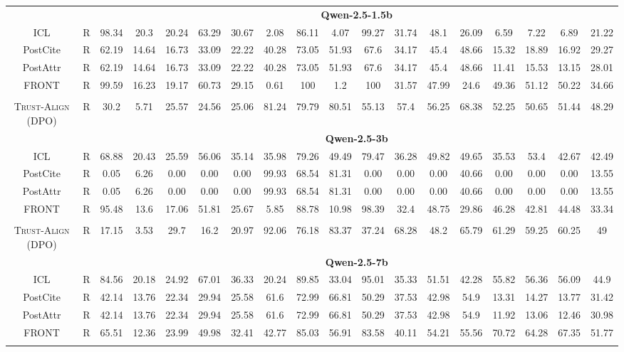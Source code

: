 \documentclass{article} %
\newcommand{\method}[0]{\textsc{Trust-Align}}
\begin{document}
\begin{table}[htb!]
{\begin{tabular}{ccc*{15}c}
& & \multicolumn{16}{c}{\cellcolor[gray]{0.9}\textbf{Qwen-2.5-1.5b}} \\
ICL & R & 98.34 & 20.3 & 20.24 & 63.29 & 30.67 & 2.08 & 86.11 & 4.07 & 99.27 & 31.74 & 48.1 & 26.09 & 6.59 & 7.22 & 6.89 & 21.22 \\
PostCite & R &  62.19 & 14.64 & 16.73 & 33.09 & 22.22 & 40.28 & 73.05 & 51.93 & 67.6 & 34.17 & 45.4 & 48.66 & 15.32 & 18.89 & 16.92 & 29.27 \\
PostAttr & R & 62.19 & 14.64 & 16.73 & 33.09 & 22.22 & 40.28 & 73.05 & 51.93 & 67.6 & 34.17 & 45.4 & 48.66 & 11.41 & 15.53 & 13.15 & 28.01 \\
FRONT & R & 99.59 & 16.23 & 19.17 & 60.73 & 29.15 & 0.61 & 100 & 1.2 & 100 & 31.57 & 47.99 & 24.6 & 49.36 & 51.12 & 50.22 & 34.66 \\\\

\method{} (DPO) & R & 30.2 & 5.71 & 25.57 & 24.56 & 25.06 & 81.24 & 79.79 & 80.51 & 55.13 & 57.4 & 56.25 & 68.38 & 52.25 & 50.65 & 51.44 & 48.29 \\ 

& & \multicolumn{16}{c}{\cellcolor[gray]{0.9}\textbf{Qwen-2.5-3b}} \\

ICL & R & 68.88 & 20.43 & 25.59 & 56.06 & 35.14 & 35.98 & 79.26 & 49.49 & 79.47 & 36.28 & 49.82 & 49.65 & 35.53 & 53.4 & 42.67 & 42.49 \\
PostCite & R & 0.05 & 6.26 & 0.00 & 0.00 & 0.00 & 99.93 & 68.54 & 81.31 & 0.00 & 0.00 & 0.00 & 40.66 & 0.00 & 0.00 & 0.00& 13.55 \\
PostAttr & R & 0.05 & 6.26 & 0.00 & 0.00 & 0.00 & 99.93 & 68.54 & 81.31 & 0.00 & 0.00 & 0.00 & 40.66 & 0.00 & 0.00 & 0.00 & 13.55 \\
FRONT & R & 95.48 & 13.6 & 17.06 & 51.81 & 25.67 & 5.85 & 88.78 & 10.98 & 98.39 & 32.4 & 48.75 & 29.86 & 46.28 & 42.81 & 44.48 & 33.34 \\\\

\method{} (DPO) & R & 17.15 & 3.53 & 29.7 & 16.2 & 20.97 & 92.06 & 76.18 & 83.37 & 37.24 & 68.28 & 48.2 & 65.79 & 61.29 & 59.25 & 60.25 & 49 \\

& & \multicolumn{16}{c}{\cellcolor[gray]{0.9}\textbf{Qwen-2.5-7b}} \\
ICL & R & 84.56 & 20.18 & 24.92 & 67.01 & 36.33 & 20.24 & 89.85 & 33.04 & 95.01 & 35.33 & 51.51 & 42.28 & 55.82 & 56.36 & 56.09 & 44.9 \\
PostCite & R & 42.14 & 13.76 & 22.34 & 29.94 & 25.58 & 61.6 & 72.99 & 66.81 & 50.29 & 37.53 & 42.98 & 54.9 & 13.31 & 14.27 & 13.77 & 31.42 \\
PostAttr & R & 42.14 & 13.76 & 22.34 & 29.94 & 25.58 & 61.6 & 72.99 & 66.81 & 50.29 & 37.53 & 42.98 & 54.9 & 11.92 & 13.06 & 12.46 & 30.98 \\
FRONT & R & 65.51 & 12.36 & 23.99 & 49.98 & 32.41 & 42.77 & 85.03 & 56.91 & 83.58 & 40.11 & 54.21 & 55.56 & 70.72 & 64.28 & 67.35 & 51.77 \\\\


\end{tabular}}
\end{table}
\end{document}
